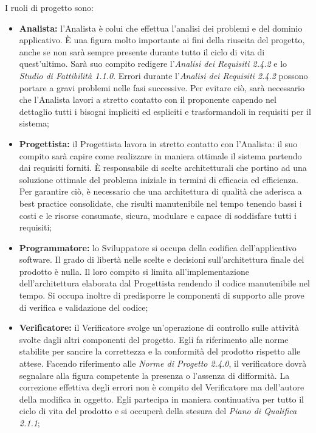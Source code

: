    			\noindent I ruoli di progetto sono:
   			\begin{itemize}
   				\item \textbf{Analista:} l'Analista è colui che effettua l'analisi dei problemi e del dominio applicativo. È una figura molto importante ai fini della riuscita del progetto, anche se non sarà sempre presente durante tutto il ciclo di vita di quest'ultimo. Sarà suo compito redigere l'\textit{Analisi dei Requisiti 2.4.2\doc} e lo \textit{Studio di Fattibilità 1.1.0\doc}. Errori durante l'\textit{Analisi dei Requisiti 2.4.2\doc} possono portare a gravi problemi nelle fasi successive. Per evitare ciò, sarà necessario che l'Analista lavori a stretto contatto con il proponente capendo nel dettaglio tutti i bisogni impliciti ed espliciti e trasformandoli in requisiti per il sistema;
   				\item \textbf{Progettista:} il Progettista lavora in stretto contatto con l'Analista: il suo compito sarà capire come realizzare in maniera ottimale il sistema partendo dai requisiti forniti. È responsabile di scelte architetturali che portino ad una soluzione ottimale del problema iniziale in termini di efficacia ed efficienza. Per garantire ciò, è necessario che una architettura di qualità che aderisca a best practice consolidate, che risulti manutenibile nel tempo tenendo bassi i costi e le risorse consumate, sicura, modulare e capace di soddisfare tutti i requisiti;
   				\item \textbf{Programmatore:} lo Sviluppatore si occupa della codifica dell'applicativo software. Il grado di libertà nelle scelte e decisioni sull'architettura finale del prodotto è nulla. Il loro compito si limita all'implementazione dell'architettura elaborata dal Progettista rendendo il codice manutenibile nel tempo. Si occupa inoltre di predisporre le componenti di supporto alle prove di verifica e validazione del codice;
   				\item \textbf{Verificatore:} il Verificatore svolge un'operazione di controllo sulle attività svolte dagli altri componenti del progetto. Egli fa riferimento alle norme stabilite per sancire la correttezza e la conformità del prodotto rispetto alle attese. Facendo riferimento alle \textit{Norme di Progetto 2.4.0\doc}, il verificatore dovrà segnalare alla figura competente la presenza o l'assenza di difformità. La correzione effettiva degli errori non è compito del Verificatore ma dell'autore della modifica in oggetto. Egli partecipa in maniera continuativa per tutto il ciclo di vita del prodotto e si occuperà della stesura del \textit{Piano di Qualifica 2.1.1\docs};

\end{itemize}

